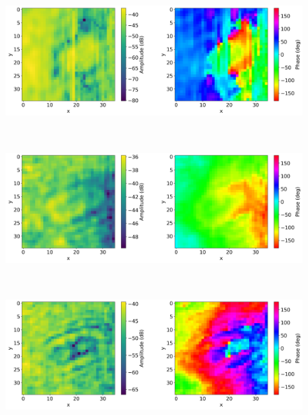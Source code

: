 \documentclass[11pt,a4paper,uplatex]{ujarticle}
\begin{document}
  \begin{figure}[tbp]
    \begin{minipage}[b]{0.995\textwidth}
      \centering
      \includegraphics[keepaspectratio, width=140mm]{Images/python/yokonarabe/019/50.png}
    \end{minipage}\\
    \begin{minipage}[b]{0.995\textwidth}
      \centering
      \includegraphics[keepaspectratio, width=140mm]{Images/python/yokonarabe/019/90.png}
    \end{minipage}\\
    \begin{minipage}[b]{0.995\textwidth}
      \centering
      \includegraphics[keepaspectratio, width=140mm]{Images/python/yokonarabe/019/130.png}
    \end{minipage}\\
    \begin{minipage}[b]{0.995\textwidth}
      \centering

\end{minipage}
\end{figure}
\end{document}
